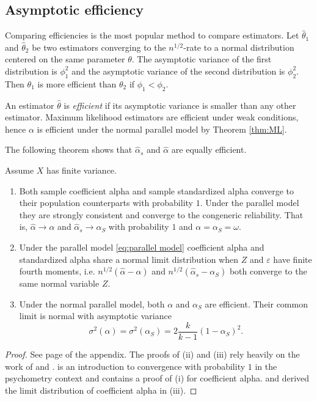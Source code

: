 \documentclass[twoside]{article}
\begin{document}
\subsection{Asymptotic efficiency}
Comparing efficiencies is the most popular method to compare estimators. Let $\hat{\theta}_1$ and $\hat{\theta}_2$ be two estimators converging to the $n^{1/2}$-rate to a normal distribution centered on the same parameter $\theta$. The asymptotic variance of the first distribution is $\phi_1^2$ and the asymptotic variance of the second distribution is $\phi_2^2$. Then $\theta_1$ is more efficient than $\theta_2$ if $\phi_1<\phi_2$. 

An estimator $\hat{\theta}$ is \textit{efficient} \citep[][Section 4.3]{Lehmann2004-ke} if its asymptotic variance is smaller than any other estimator. Maximum likelihood estimators are efficient under weak conditions, hence $\alpha$ is efficient under the normal parallel model by Theorem \ref{thm:ML}.  

The following theorem shows that $\hat{\alpha}_s$ and $\hat{\alpha}$ are equally efficient.

\begin{thm}
\label{thm:asymptotics}
Assume $X$ has finite variance. 
\begin{enumerate}[label=(\roman*)]
    \item Both sample coefficient alpha and sample standardized alpha converge to their population counterparts with probability $1$. Under the parallel model they are strongly consistent and converge to the congeneric reliability. That is, $\hat{\alpha}\to\alpha$ and $\hat{\alpha}_s\to\alpha_S$ with probability $1$ and $\alpha = \alpha_S = \omega$.
    \item Under the parallel model \eqref{eq:parallel model} coefficient alpha and standardized alpha share a normal limit distribution when $Z$ and $\varepsilon$ have finite fourth moments, i.e. $n^{1/2}(\hat{\alpha} - \alpha)$ and  $n^{1/2}(\hat{\alpha}_s - \alpha_S)$ both converge to the same normal variable $Z$.
    \item Under the normal parallel model, both $\alpha$ and $\alpha_S$ are efficient. Their common limit is normal with asymptotic variance 
    $$\sigma^{2}(\alpha)= \sigma^{2}(\alpha_S)=2\frac{k}{k-1}(1-\alpha_S)^{2}.$$
\end{enumerate}
\end{thm}    
\begin{proof}
See page \pageref{proof:asymptotics} of the appendix. The proofs of (ii) and (iii) rely heavily on the work of \citet{Van_Zyl2000-si} and \citet{hayashi2005note}. \citet{Raykov2019-tv} is an introduction to convergence with probability $1$ in the psychometry context and contains a proof of (i) for coefficient alpha. \citet[][eq. 13]{Van_Zyl2000-si} and \citet[][eq. 58]{Kristof1963-tb} derived the limit distribution of coefficient alpha in (iii).
\end{proof}
\end{document}

